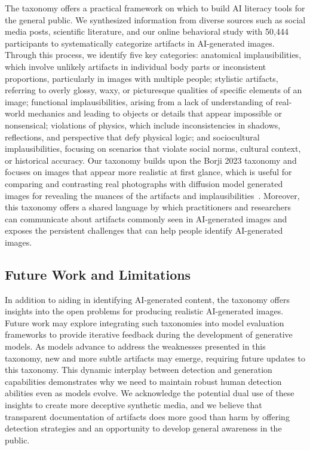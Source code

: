 The taxonomy offers a practical framework on which to build AI literacy tools for the general public. We synthesized information from diverse sources such as social media posts, scientific literature, and our online behavioral study with 50,444 participants to systematically categorize artifacts in AI-generated images. Through this process, we identify five key categories: anatomical implausibilities, which involve unlikely artifacts in individual body parts or inconsistent proportions, particularly in images with multiple people;  stylistic artifacts, referring to overly glossy, waxy, or picturesque qualities of specific elements of an image; functional implausibilities, arising from a lack of understanding of real-world mechanics and leading to objects or details that appear impossible or nonsensical; violations of physics, which include inconsistencies in shadows, reflections, and perspective that defy physical logic; and sociocultural implausibilities, focusing on scenarios that violate social norms, cultural context, or historical accuracy. Our taxonomy builds upon the Borji 2023 taxonomy \cite{borji2023qualitative} and focuses on images that appear more realistic at first glance, which is useful for comparing and contrasting real photographs with diffusion model generated images for revealing the nuances of the artifacts and implausibilities~\cite{kamali2024distinguish}. Moreover, this taxonomy offers a shared language by which practitioners and researchers can communicate about artifacts commonly seen in AI-generated images and exposes the persistent challenges that can help people identify AI-generated images. 

\subsection{Future Work and Limitations}

In addition to aiding in identifying AI-generated content, the taxonomy offers insights into the open problems for producing realistic AI-generated images. Future work may explore integrating such taxonomies into model evaluation frameworks to provide iterative feedback during the development of generative models. As models advance to address the weaknesses presented in this taxonomy, new and more subtle artifacts may emerge, requiring future updates to this taxonomy. This dynamic interplay between detection and generation capabilities demonstrates why we need to maintain robust human detection abilities even as models evolve. We acknowledge the potential dual use of these insights to create more deceptive synthetic media, and we believe that transparent documentation of artifacts does more good than harm by offering detection strategies and an opportunity to develop general awareness in the public.

